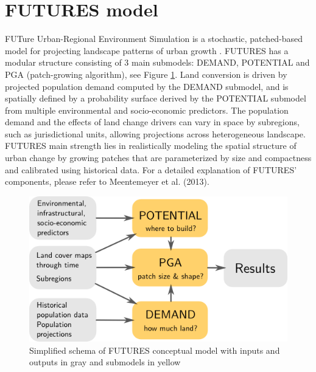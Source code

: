 \documentclass{isprs}
\begin{document}
\section{FUTURES model}
FUTure Urban-Regional Environment Simulation
is a stochastic, patched-based model
for projecting landscape patterns of urban growth \cite{Meentemeyer2012}.
FUTURES has a modular structure consisting of 3 main submodels: DEMAND, POTENTIAL and
PGA (patch-growing algorithm), see Figure \ref{fig:schema}.
Land conversion is driven by projected population demand computed by the DEMAND submodel,
and is spatially defined by a probability surface derived by  the POTENTIAL submodel
from multiple environmental and socio-economic predictors.
The population demand and the effects of land change drivers can vary in space by subregions,
such as jurisdictional units, allowing projections across heterogeneous landscape.
FUTURES main strength lies in realistically modeling the 
spatial structure of urban change by growing patches 
that are
parameterized by size and compactness 
and calibrated using historical data.
For a detailed explanation of FUTURES' components, please refer to Meentemeyer et al. (2013).

\begin{figure}[h!]
 \centering
 \includegraphics[width=0.9\columnwidth]{./figures/schema.png}
 \caption{Simplified schema of FUTURES conceptual model  with inputs and outputs in gray and submodels in yellow}
 \label{fig:schema}
\end{figure}
\end{document}
